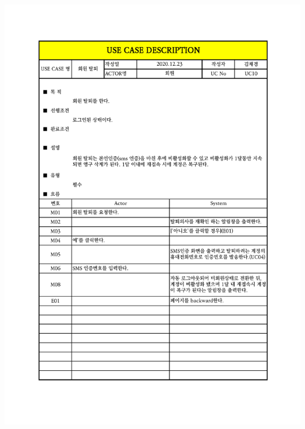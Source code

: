 {{{{{{{{{{{\includegraphics[width=1.1\textwidth]{./Figure/Design/Display/usecase/010.pdf} \\
}}}}}}}}}}}
